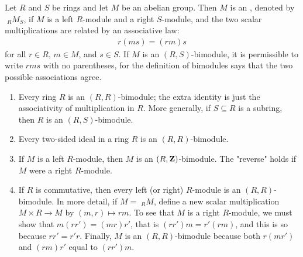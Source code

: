     \begin{definition}\label{def:bimodules}
        Let $R$ and $S$ be rings and let $M$ be an abelian group. Then $M$ is an , denoted by $\phantom{.}_R M_S$, if $M$ is a left $R$-module and a right $S$-module, and the two scalar multiplications are related by an associative law:
            \begin{equation*}
            \begin{split}
                r(ms)=(rm)s
            \end{split}
            \end{equation*}
        for all $r \in R$, $m \in M$, and $s \in S$. If $M$ is an $(R,S)$-bimodule, it is permissible to write $rms$ with no parentheses, for the definition of bimodules says that the two possible associations agree.
    \end{definition}

    \begin{example}
        \phantom{a}
        \begin{enumerate}[label = (\arabic*)]
            \item Every ring $R$ is an $(R,R)$-bimodule; the extra identity is just the associativity of multiplication in $R$. More generally, if $S \subseteq R$ is a subring, then $R$ is an $(R,S)$-bimodule.
            \item Every two-sided ideal in a ring $R$ is an $(R,R)$-bimodule.
            \item If $M$ is a left $R$-module, then $M$ is an $(R,\mathbf{Z})$-bimodule. The "reverse" holds if $M$ were a right $R$-module.
            \item If $R$ is commutative, then every left (or right) $R$-module is an $(R,R)$-bimodule. In more detail, if $M=\phantom{.}_R M$, define a new scalar multiplication $M \times R \rightarrow M$ by $(m,r) \mapsto rm$. To see that $M$ is a right $R$-module, we must show that $m(rr') = (mr)r'$, that is $(rr')m = r'(rm)$, and this is so because $rr' = r'r$. Finally, $M$ is an $(R,R)$-bimodule because both $r(mr')$ and $(rm)r'$ equal to $(rr')m$.
        \end{enumerate}
    \end{example}

